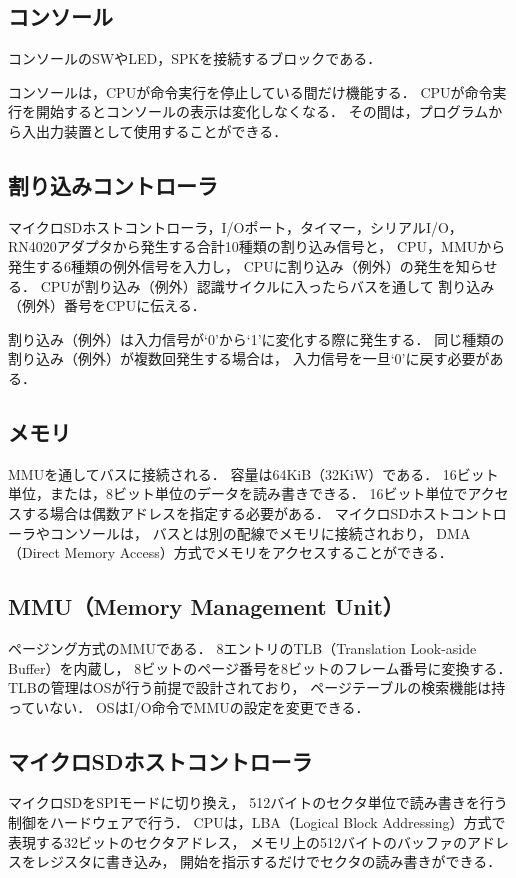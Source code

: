 \subsection{コンソール}
コンソールのSWやLED，SPKを接続するブロックである．

コンソールは，CPUが命令実行を停止している間だけ機能する．
CPUが命令実行を開始するとコンソールの表示は変化しなくなる．
その間は，プログラムから入出力装置として使用することができる．

\subsection{割り込みコントローラ}
マイクロSDホストコントローラ，I/Oポート，タイマー，シリアルI/O，
RN4020アダプタから発生する合計10種類の割り込み信号と，
CPU，MMUから発生する6種類の例外信号を入力し，
CPUに割り込み（例外）の発生を知らせる．
CPUが割り込み（例外）認識サイクルに入ったらバスを通して
割り込み（例外）番号をCPUに伝える．

割り込み（例外）は入力信号が`0'から`1'に変化する際に発生する．
同じ種類の割り込み（例外）が複数回発生する場合は，
入力信号を一旦`0'に戻す必要がある．

\subsection{メモリ}
MMUを通してバスに接続される．
容量は64KiB（32KiW）である．
16ビット単位，または，8ビット単位のデータを読み書きできる．
16ビット単位でアクセスする場合は偶数アドレスを指定する必要がある．
マイクロSDホストコントローラやコンソールは，
バスとは別の配線でメモリに接続されおり，
DMA（Direct Memory Access）方式でメモリをアクセスすることができる．

\subsection{MMU（Memory Management Unit）}
ページング方式のMMUである．
8エントリのTLB（Translation Look-aside Buffer）を内蔵し，
8ビットのページ番号を8ビットのフレーム番号に変換する．
TLBの管理はOSが行う前提で設計されており，
ページテーブルの検索機能は持っていない．
OSはI/O命令でMMUの設定を変更できる．

\subsection{マイクロSDホストコントローラ}
マイクロSDをSPIモードに切り換え，
512バイトのセクタ単位で読み書きを行う制御をハードウェアで行う．
CPUは，LBA（Logical Block Addressing）方式で表現する32ビットのセクタアドレス，
メモリ上の512バイトのバッファのアドレスをレジスタに書き込み，
開始を指示するだけでセクタの読み書きができる．

